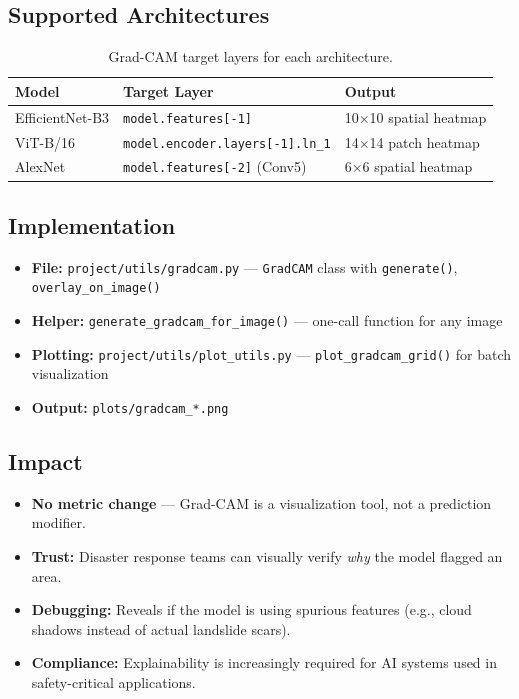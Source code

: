 \documentclass[11pt]{article}
\begin{document}
\subsection{Supported Architectures}

\begin{table}[H]
\centering
\renewcommand{\arraystretch}{1.2}
\begin{tabular}{lll}
\toprule
\textbf{Model} & \textbf{Target Layer} & \textbf{Output} \\
\midrule
EfficientNet-B3 & \texttt{model.features[-1]} & 10$\times$10 spatial heatmap \\
ViT-B/16        & \texttt{model.encoder.layers[-1].ln\_1} & 14$\times$14 patch heatmap \\
AlexNet         & \texttt{model.features[-2]} (Conv5) & 6$\times$6 spatial heatmap \\
\bottomrule
\end{tabular}
\caption{Grad-CAM target layers for each architecture.}
\end{table}

\subsection{Implementation}

\begin{itemize}[noitemsep]
    \item \textbf{File:} \texttt{project/utils/gradcam.py} --- \texttt{GradCAM} class with \texttt{generate()}, \texttt{overlay\_on\_image()}
    \item \textbf{Helper:} \texttt{generate\_gradcam\_for\_image()} --- one-call function for any image
    \item \textbf{Plotting:} \texttt{project/utils/plot\_utils.py} --- \texttt{plot\_gradcam\_grid()} for batch visualization
    \item \textbf{Output:} \texttt{plots/gradcam\_*.png}
\end{itemize}

\subsection{Impact}

\begin{itemize}[noitemsep]
    \item \textbf{No metric change} --- Grad-CAM is a visualization tool, not a prediction modifier.
    \item \textbf{Trust:} Disaster response teams can visually verify \textit{why} the model flagged an area.
    \item \textbf{Debugging:} Reveals if the model is using spurious features (e.g., cloud shadows instead of actual landslide scars).
    \item \textbf{Compliance:} Explainability is increasingly required for AI systems used in safety-critical applications.
\end{itemize}
\end{document}
